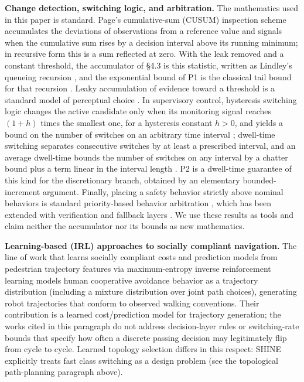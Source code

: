 \documentclass[11pt]{article}
\begin{document}
\textbf{Change detection, switching logic, and arbitration.} The mathematics used in this paper is standard. Page's cumulative-sum (CUSUM) inspection scheme \cite{page1954cusum} accumulates the deviations of observations from a reference value and signals when the cumulative sum rises by a decision interval above its running minimum; in recursive form this is a sum reflected at zero. With the leak removed and a constant threshold, the accumulator of \S4.3 is this statistic, written as Lindley's queueing recursion \cite{lindley1952queue}, and the exponential bound of P1 is the classical tail bound for that recursion \cite{kingman1970queues}. Leaky accumulation of evidence toward a threshold is a standard model of perceptual choice \cite{usher2001lca}. In supervisory control, hysteresis switching logic changes the active candidate only when its monitoring signal reaches $(1+h)$ times the smallest one, for a hysteresis constant $h>0$, and yields a bound on the number of switches on an arbitrary time interval \cite{hespanha2003hysteresis}; dwell-time switching separates consecutive switches by at least a prescribed interval, and an average dwell-time bounds the number of switches on any interval by a chatter bound plus a term linear in the interval length \cite{hespanha1999dwell}. P2 is a dwell-time guarantee of this kind for the discretionary branch, obtained by an elementary bounded-increment argument. Finally, placing a safety behavior strictly above nominal behaviors is standard priority-based behavior arbitration \cite{orzechowski2020arbitration}, which has been extended with verification and fallback layers \cite{spieker2024arbitration}. We use these results as tools and claim neither the accumulator nor its bounds as new mathematics.

\textbf{Learning-based (IRL) approaches to socially compliant navigation.} The line of work that learns socially compliant costs and prediction models from pedestrian trajectory features via maximum-entropy inverse reinforcement learning \cite{kuderer2012feature, kretzschmar2016irl} models human cooperative avoidance behavior as a trajectory distribution (including a mixture distribution over joint path choices), generating robot trajectories that conform to observed walking conventions. Their contribution is a learned cost/prediction model for trajectory generation; the works cited in this paragraph do not address decision-layer rules or switching-rate bounds that specify how often a discrete passing decision may legitimately flip from cycle to cycle. Learned topology selection differs in this respect: SHINE \cite{martinezbaselga2026shine} explicitly treats fast class switching as a design problem (see the topological path-planning paragraph above).
\end{document}
